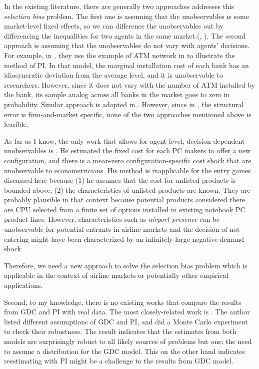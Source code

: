 \documentclass[a4paper]{article}
\begin{document}
In the existing literature, there are generally two approaches addresses this \textit{selection bias} problem. The first one is assuming that the unobservables is some market-level fixed effects, so we can difference the unobservables out by differencing the inequalities for two agents in the same market.(\cite{ellickson2013estimating}, \cite{ho2014hospital}). The second approach is assuming that the unobservables do not vary with agents' decisions. For example, in \cite{pakes2015moment},  they use the example of ATM network in \cite{ishii2008compatibility} to illustrate the method of PI. In that model, the marginal installation cost of each bank has an idiosyncratic deviation from the average level, and it is unobservable to researchers. However, since it does not vary with the number of ATM installed by the bank, its sample analog across all banks in the market goes to zero in probability. Similar approach is adopted in \cite{ho2009insurer}. However, since in \cite{ciliberto2009market}, the structural error is firm-and-market specific, none of the two approaches mentioned above is feasible. 

As far as I know, the only work that allows for agent-level, decision-dependent unobservables is \cite{eizenberg2014upstream}. He estimated the fixed cost for each PC makers to offer a new configuration, and there is a mean-zero configuration-specific cost shock that are unobservable to econometricians. His method is inapplicable for the entry games discussed here because (1) he assumes that the cost for unlisted products is bounded above; (2) the characteristics of unlisted products are known. They are probably plausible in that context because potential products considered there are CPU selected from a finite set of options installed in existing notebook PC product lines. However, characteristics such as \textit{airport presence} can be unobservable for potential entrants in airline markets and the decision of not entering might have been characterized by an infinitely-large negative demand shock. 

Therefore, we need a new approach to solve the selection bias problem which is applicable in the context of airline markets or potentially other empirical applications.

Second, to my knowledge, there is no existing works that compare the results from GDC and PI with real data. The most closely-related work is \cite{pakes2010alternative}. The author listed different assumptions of GDC and PI, and did a Monte Carlo experiment to check their robustness. The result indicates that the estimates from both models are surprisingly robust to all likely sources of problems but one: the need to assume a distribution for the GDC model. This on the other hand indicates reestimating \cite{ciliberto2009market} with PI might be a challenge to the results from GDC model.
\end{document}
